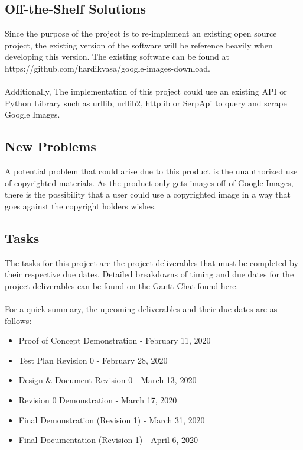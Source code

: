 \documentclass[12pt, titlepage]{article}
\begin{document}
\subsection{Off-the-Shelf Solutions}

Since the purpose of the project is to re-implement an existing open source project,  the existing version of the software will be reference heavily when developing  this  version.   The existing software can be found at https://github.com/hardikvasa/google-images-download.
\\
\\
Additionally, The implementation of this project could use an existing API or Python Library such as urllib, urllib2, httplib or SerpApi to query  and scrape Google Images.

\subsection{New Problems}

A potential problem that could arise due to this product is the unauthorized use of copyrighted materials. As the product only gets images off of Google Images, there is the possibility that a user could use a copyrighted image in a way that goes against the copyright holders wishes.

\subsection{Tasks}

The tasks for this project are the project deliverables that must be completed by their respective due dates. Detailed breakdowns of timing and due dates for the project deliverables can be found on the Gantt Chat found  \href{https://gitlab.cas.mcmaster.ca/guinnesj/google-images-downloader/blob/master/ProjectSchedule/Gantt-Chart.pdf}{here}. 
\\ \\
For a quick summary, the upcoming deliverables and their due dates are as follows:
\begin{itemize}
    \item Proof of Concept Demonstration - February 11, 2020
    \item Test Plan Revision 0 - February 28, 2020
    \item Design \& Document Revision 0 - March 13, 2020
    \item Revision 0 Demonstration - March 17, 2020
    \item Final Demonstration (Revision 1) - March 31, 2020
    \item Final Documentation (Revision 1) - April 6, 2020
\end{itemize}
\end{document}
